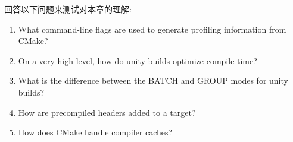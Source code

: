 回答以下问题来测试对本章的理解:

\begin{enumerate}
\item 
What command-line flags are used to generate profiling information from CMake?

\item 
On a very high level, how do unity builds optimize compile time?

\item 
What is the difference between the BATCH and GROUP modes for unity builds?

\item 
How are precompiled headers added to a target?

\item 
How does CMake handle compiler caches?
\end{enumerate}